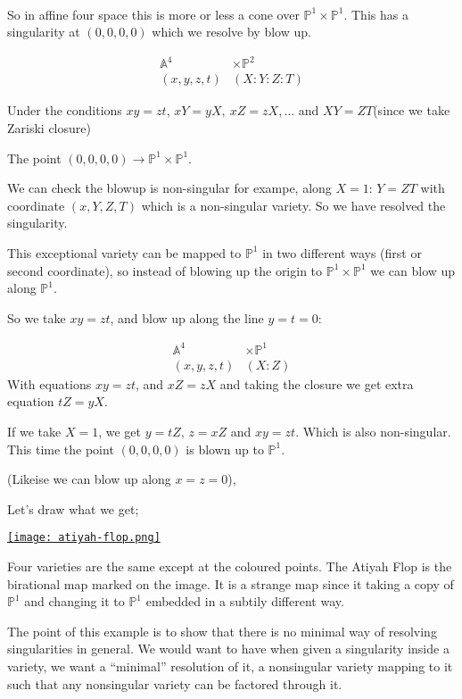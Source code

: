 \

So in affine four space this is more or less a cone over $\mathbb{P}^1\times\mathbb{P}^1$. This has a singularity at $(0,0,0,0)$ which we resolve by blow up.

\[\begin{array}{cc}
    \mathbb{A}^4&\times \mathbb{P}^2\\
    (x,y,z,t)&(X\colon Y\colon Z\colon T)
\end{array}\]

Under the conditions $xy=zt$, $xY=yX, \ xZ = zX, \ldots$ and $XY = ZT$(since we take Zariski closure)

The point $(0,0,0,0)\rightarrow \mathbb{P}^1\times \mathbb{P}^1$. 

We can check the blowup is non-singular for exampe, along $X=1$: $Y=ZT$ with coordinate $(x,Y,Z,T)$ which is a non-singular variety. So we have resolved the singularity.


This exceptional variety can be mapped to $\mathbb{P}^1$ in two different ways (first or second coordinate), so instead of blowing up the origin to $\mathbb{P}^1\times \mathbb{P}^1$ we can blow up along $\mathbb{P}^1$.

So we take $xy = zt$, and blow up along the line $y=t=0$:

\[\begin{array}{cc}
    \mathbb{A}^4&\times \mathbb{P}^1\\
    (x,y,z,t)&(X\colon Z)
\end{array}\]
With equations $xy=zt$, and $xZ = zX$ and taking the closure we get extra equation $tZ=yX$.

If we take $X=1$, we get $y=tZ$, $z=xZ$ and $xy=zt$. Which is also non-singular. This time the point $(0,0,0,0)$ is blown up to $\mathbb{P}^1$.

(Likeise we can blow up along $x=z=0$),

Let's draw what we get;

\href{https://youtu.be/OkOfa8vDdiQ?t=589}{\texttt{[image: atiyah-flop.png]}}

Four varieties are the same except at the coloured points. The Atiyah Flop is the birational map marked on the image. It is a strange map since it taking a copy of $\mathbb{P}^1$ and changing it to $\mathbb{P}^1$ embedded in a subtily different way.

The point of this example is to show that there is no minimal way of resolving singularities in general. We would want to have when given a singularity inside a variety, we want a ``minimal'' resolution of it, a nonsingular variety mapping to it such that any nonsingular variety can be factored through it.

